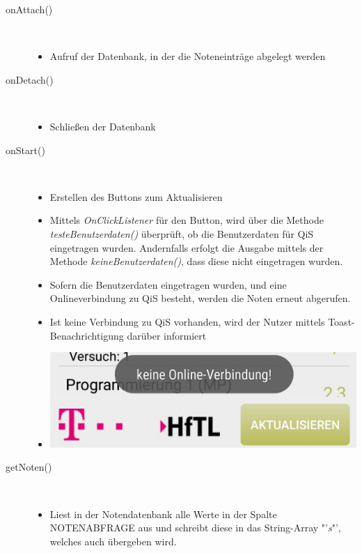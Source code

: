 \begin{description}
\item[onAttach()]~\par
\begin{itemize}
\item Aufruf der Datenbank, in der die Noteneinträge abgelegt werden
\end{itemize}

 
\item[onDetach()]~\par
\begin{itemize}
\item Schließen der Datenbank
\end{itemize}

 
\item[onStart()]~\par
\begin{itemize}
\item Erstellen des Buttons zum Aktualisieren
\item Mittels \textit{OnClickListener} für den Button, wird über die Methode \textit{testeBenutzerdaten()} überprüft, ob die Benutzerdaten für QiS eingetragen wurden. Andernfalls erfolgt die Ausgabe mittels der Methode \textit{keineBenutzerdaten()}, dass diese nicht eingetragen wurden. 
\item Sofern die Benutzerdaten eingetragen wurden, und eine Onlineverbindung zu QiS besteht, werden die Noten erneut abgerufen. 
\item Ist keine Verbindung zu QiS vorhanden, wird der Nutzer mittels Toast-Benachrichtigung darüber informiert
\item[] \includegraphics[scale=0.5]{05_Handbuch/img/Noten_Toast.jpg}
\end{itemize}
\item[getNoten()]~\par
\begin{itemize}
\item Liest in der Notendatenbank alle Werte in der Spalte \textcolor{lila}{NOTENABFRAGE} aus und schreibt diese in das String-Array "'\textit{s}"', welches auch übergeben wird.
\end{itemize}


\end{description}
